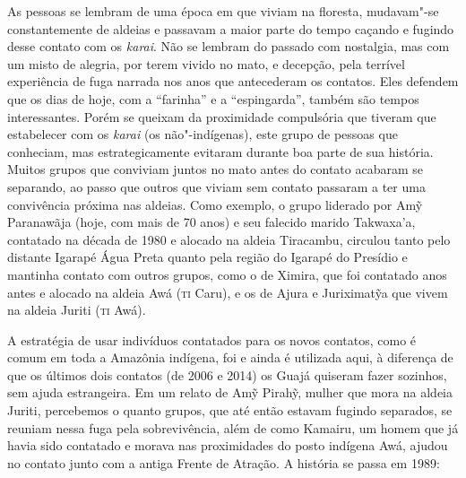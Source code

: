 As pessoas se lembram de uma época em que viviam na floresta, mudavam"-se
constantemente de aldeias e passavam a maior parte do tempo caçando e
fugindo desse contato com os \emph{karai}. Não se lembram do passado com
nostalgia, mas com um misto de alegria, por terem vivido no mato, e
decepção, pela terrível experiência de fuga narrada nos anos que
antecederam os contatos. Eles defendem que os dias de hoje, com a
``farinha'' e a ``espingarda'', também são tempos interessantes. Porém
se queixam da proximidade compulsória que tiveram que estabelecer com os
\emph{karai} (os não"-indígenas), este grupo de pessoas que conheciam,
mas estrategicamente evitaram durante boa parte de sua história. Muitos
grupos que conviviam juntos no mato antes do contato acabaram se
separando, ao passo que outros que viviam sem contato passaram a ter uma
convivência próxima nas aldeias. Como exemplo, o grupo liderado por Amỹ
Paranawãja (hoje, com mais de 70 anos) e seu falecido marido Takwaxa'a,
contatado na década de 1980 e alocado na aldeia Tiracambu, circulou
tanto pelo distante Igarapé Água Preta quanto pela região do Igarapé do
Presídio e mantinha contato com outros grupos, como o de Ximira, que foi
contatado anos antes e alocado na aldeia Awá (\textsc{ti} Caru), e os de
Ajura e Juriximatỹa que vivem na aldeia Juriti (\textsc{ti} Awá).

A estratégia de usar indivíduos contatados para os novos contatos, como
é comum em toda a Amazônia indígena, foi e ainda é utilizada aqui, à
diferença de que os últimos dois contatos (de 2006 e 2014) os Guajá
quiseram fazer sozinhos, sem ajuda estrangeira. Em um relato de Amỹ
Pirahỹ, mulher que mora na aldeia Juriti, percebemos o quanto grupos,
que até então estavam fugindo separados, se reuniam nessa fuga pela
sobrevivência, além de como Kamairu, um homem que já havia sido
contatado e morava nas proximidades do posto indígena Awá, ajudou
no contato junto com a antiga Frente de Atração. A história se passa em
1989:

